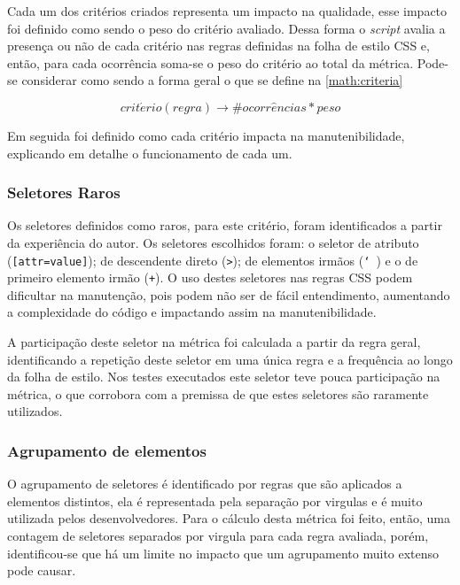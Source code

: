 Cada um dos critérios criados representa um impacto na qualidade, esse impacto foi definido como sendo o peso do critério avaliado. Dessa forma o \textit{script} avalia a presença ou não de cada critério nas regras definidas na folha de estilo CSS e, então, para cada ocorrência soma-se o peso do critério ao total da métrica. Pode-se considerar como sendo a forma geral o que se define na \autoref{math:criteria}

\begin{equation}
\label{math:criteria}
	crit\acute{e}rio(regra) \rightarrow \# ocorr\hat{e}ncias * peso
\end{equation}

Em seguida foi definido como cada critério impacta na manutenibilidade, explicando em detalhe o funcionamento de cada um.

\subsubsection{Seletores Raros}
Os seletores definidos como raros, para este critério, foram identificados a partir da experiência do autor. Os seletores escolhidos foram: o seletor de atributo (\texttt{[attr=value]}); de descendente direto (\texttt{>}); de elementos irmãos (\texttt{\char`~}) e o de primeiro elemento irmão (\texttt{+}). O uso destes seletores nas regras CSS podem dificultar na manutenção, pois podem não ser de fácil entendimento, aumentando a complexidade do código e impactando assim na manutenibilidade.

A participação deste seletor na métrica foi calculada a partir da regra geral, identificando a repetição deste seletor em uma única regra e a frequência ao longo da folha de estilo. Nos testes executados este seletor teve pouca participação na métrica, o que corrobora com a premissa de que estes seletores são raramente utilizados.

\subsubsection{Agrupamento de elementos}
O agrupamento de seletores é identificado por regras que são aplicados a elementos distintos, ela é representada pela separação por virgulas e é muito utilizada pelos desenvolvedores. Para o cálculo desta métrica foi feito, então, uma contagem de seletores separados por virgula para cada regra avaliada, porém, identificou-se que há um limite no impacto que um agrupamento muito extenso pode causar. 

